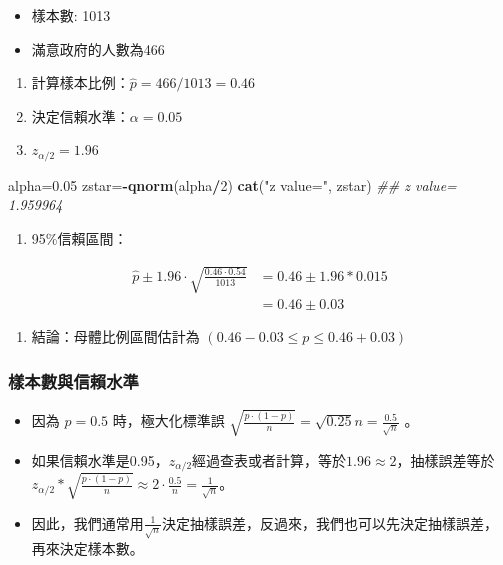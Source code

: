 \documentclass[hyperref,]{ctexart}
\newenvironment{Shaded}{\begin{snugshade}}{\end{snugshade}}
\newcommand{\CommentTok}[1]{\textcolor[rgb]{0.56,0.35,0.01}{\textit{#1}}}
\newcommand{\DecValTok}[1]{\textcolor[rgb]{0.00,0.00,0.81}{#1}}
\newcommand{\FloatTok}[1]{\textcolor[rgb]{0.00,0.00,0.81}{#1}}
\newcommand{\KeywordTok}[1]{\textcolor[rgb]{0.13,0.29,0.53}{\textbf{#1}}}
\newcommand{\NormalTok}[1]{#1}
\newcommand{\OperatorTok}[1]{\textcolor[rgb]{0.81,0.36,0.00}{\textbf{#1}}}
\newcommand{\StringTok}[1]{\textcolor[rgb]{0.31,0.60,0.02}{#1}}
\providecommand{\tightlist}{%
  \setlength{\itemsep}{0pt}\setlength{\parskip}{0pt}}
\begin{document}
\begin{itemize}
\tightlist
\item
  樣本數: 1013
\item
  滿意政府的人數為466
\end{itemize}

\begin{enumerate}
\def\labelenumi{\arabic{enumi}.}
\tightlist
\item
  計算樣本比例：\(\hat{p}=466/1013=0.46\)
\item
  決定信賴水準：\(\alpha=0.05\)
\item
  \(z_{\alpha/2}=1.96\)
\end{enumerate}

\begin{Shaded}
\begin{Highlighting}[]
\NormalTok{alpha=}\FloatTok{0.05}
\NormalTok{zstar=}\OperatorTok{-}\KeywordTok{qnorm}\NormalTok{(alpha}\OperatorTok{/}\DecValTok{2}\NormalTok{)}
\KeywordTok{cat}\NormalTok{(}\StringTok{"z value="}\NormalTok{, zstar)}
\CommentTok{## z value= 1.959964}
\end{Highlighting}
\end{Shaded}

\begin{enumerate}
\def\labelenumi{\arabic{enumi}.}
\setcounter{enumi}{3}
\tightlist
\item
  95\%信賴區間：
\end{enumerate}

\begin{align*}
\hat{p}\pm 1.96\cdot \sqrt{\frac{0.46\cdot0.54}{1013}} & = 0.46\pm 1.96*0.015 \\
   & = 0.46\pm 0.03
\end{align*}

\begin{enumerate}
\def\labelenumi{\arabic{enumi}.}
\setcounter{enumi}{4}
\tightlist
\item
  結論：母體比例區間估計為 \((0.46-0.03\leq p\leq 0.46+0.03)\)
\end{enumerate}

\hypertarget{ux6a23ux672cux6578ux8207ux4fe1ux8cf4ux6c34ux6e96}{%
\subsubsection{樣本數與信賴水準}\label{ux6a23ux672cux6578ux8207ux4fe1ux8cf4ux6c34ux6e96}}

\begin{itemize}
\item
  因為 \(p=0.5\) 時，極大化標準誤
  \(\sqrt{\frac{p\cdot (1-p)}{n}}=\sqrt{0.25}{n}=\frac{0.5}{\sqrt{n}}\)
  。
\item
  如果信賴水準是0.95，\(z_{\alpha/2}\)經過查表或者計算，等於\(1.96\approx 2\)，抽樣誤差等於\(z_{\alpha/2}*\sqrt{\frac{p\cdot (1-p)}{n}}\approx 2\cdot \frac{0.5}{n}=\frac{1}{\sqrt{n}}\)。
\item
  因此，我們通常用\(\frac{1}{\sqrt{n}}\)決定抽樣誤差，反過來，我們也可以先決定抽樣誤差，再來決定樣本數。
\end{itemize}
\end{document}
